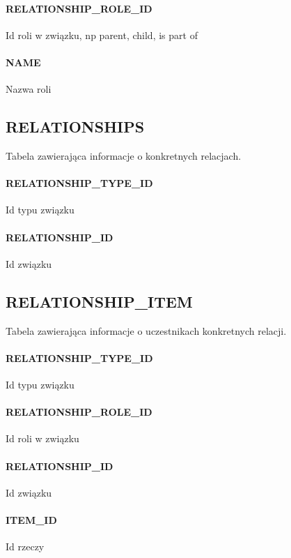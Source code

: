 \documentclass[a4paper, oneside, 11pt]{report}
\begin{document}
\paragraph{RELATIONSHIP\_ROLE\_ID} Id roli w związku, np parent, child, is part of
\paragraph{NAME} Nazwa roli

\subsection{RELATIONSHIPS}

Tabela zawierająca informacje o konkretnych relacjach.

\paragraph{RELATIONSHIP\_TYPE\_ID} Id typu związku 
\paragraph{RELATIONSHIP\_ID} Id związku

\subsection{RELATIONSHIP\_ITEM}

Tabela zawierająca informacje o uczestnikach konkretnych relacji.

\paragraph{RELATIONSHIP\_TYPE\_ID} Id typu związku 
\paragraph{RELATIONSHIP\_ROLE\_ID} Id roli w związku
\paragraph{RELATIONSHIP\_ID} Id związku
\paragraph{ITEM\_ID} Id rzeczy
\end{document}
